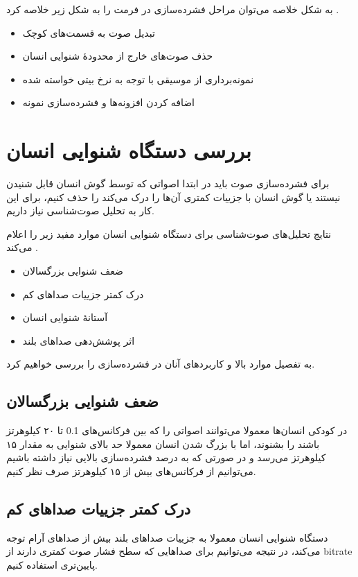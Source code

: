  به شکل خلاصه می‌توان مراحل فشرده‌سازی در فرمت  
 را به شکل زیر خلاصه کرد \cite{how_mp3_works}.

 \begin{itemize}
         \item تبدیل صوت به قسمت‌های کوچک
         \item حذف صوت‌های خارج از محدودهٔ شنوایی انسان
         \item نمونه‌برداری از موسیقی با توجه به نرخ بیتی خواسته شده
         \item اضافه کردن افزونه‌ها و فشرده‌سازی نمونه
 \end{itemize}

\section{بررسی دستگاه شنوایی انسان}
برای فشرده‌سازی صوت باید در ابتدا اصواتی که توسط گوش انسان قابل شنیدن نیستند یا گوش انسان با جزییات کمتری آن‌ها را درک می‌کند را حذف کنیم، برای 
این کار به تحلیل صوت‌شناسی
نیاز داریم. 

نتایج تحلیل‌های صوت‌شناسی برای دستگاه شنوایی انسان موارد مفید زیر را اعلام می‌کند \cite{psychoacoustic}.

\begin{itemize}
        \item ضعف شنوایی بزرگسالان
        \item درک کمتر جزییات صداهای کم
        \item آستانهٔ شنوایی انسان
        \item اثر پوشش‌دهی صداهای بلند
\end{itemize}

به تفصیل موارد بالا و کاربرد‌های آنان در فشرده‌سازی را بررسی خواهیم کرد.

\subsection{ضعف شنوایی بزرگسالان}
در کودکی انسان‌ها معمولا می‌توانند اصواتی را که بین فرکانس‌های 0.1 تا ۲۰ کیلوهرتز باشند را بشنوند، اما با بزرگ شدن انسان معمولا حد بالای شنوایی 
به مقدار ۱۵ کیلوهرتز می‌رسد و در صورتی که به درصد فشرده‌سازی بالایی نیاز داشته باشیم می‌توانیم از فرکانس‌های بیش از ۱۵ کیلوهرتز صرف نظر کنیم.

\subsection{درک کمتر جزییات صداهای کم}
دستگاه شنوایی انسان معمولا به جزییات صداهای بلند بیش از صداهای آرام توجه می‌کند، در نتیجه می‌توانیم برای صداهایی که 
سطح فشار صوت 
 کمتری دارند از bitrate پایین‌تری استفاده کنیم. 

